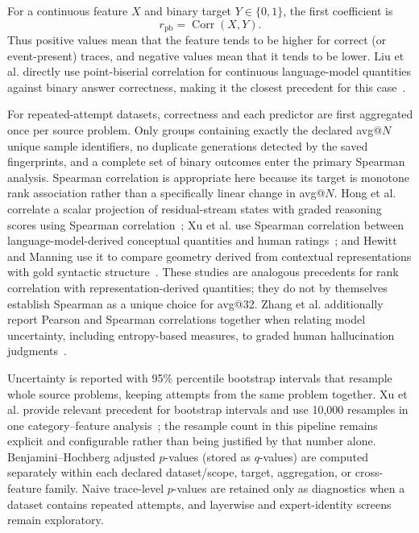 For a continuous feature $X$ and binary target $Y\in\{0,1\}$, the first
coefficient is
\begin{equation}
  r_{\mathrm{pb}} = \operatorname{Corr}(X,Y).
\end{equation}
Thus positive values mean that the feature tends to be higher for correct (or
event-present) traces, and negative values mean that it tends to be lower.
Liu et al. directly use point-biserial correlation for continuous language-model
quantities against binary answer correctness, making it the closest precedent
for this case~\cite{liu-etal-2022-figurative}.

For repeated-attempt datasets, correctness and each predictor are first
aggregated once per source problem.  Only groups containing exactly the
declared avg@$N$ unique sample identifiers, no duplicate generations detected
by the saved fingerprints, and a complete set of binary outcomes enter the
primary Spearman analysis.  Spearman correlation is appropriate here because
its target is monotone rank association rather than a specifically linear
change in avg@$N$.  Hong et al. correlate a
scalar projection of residual-stream states with graded reasoning scores using
Spearman correlation~\cite{hong-etal-2025-interplay}; Xu et al. use Spearman
correlation between language-model-derived conceptual quantities and human
ratings~\cite{xu-etal-2025-conceptual}; and Hewitt and Manning use it to compare
geometry derived from contextual representations with gold syntactic
structure~\cite{hewitt-manning-2019-structural}.  These studies are analogous
precedents for rank correlation with representation-derived quantities; they
do not by themselves establish Spearman as a unique choice for avg@32.
Zhang et al. additionally report Pearson and Spearman correlations together
when relating model uncertainty, including entropy-based measures, to graded
human hallucination judgments~\cite{zhang-etal-2023-uncertainty}.

Uncertainty is reported with 95\% percentile bootstrap intervals that resample
whole source problems, keeping attempts from the same problem together.  Xu et
al. provide relevant precedent for bootstrap intervals and use 10,000
resamples in one category--feature analysis~\cite{xu-etal-2025-conceptual}; the
resample count in this pipeline remains explicit and configurable rather than
being justified by that number alone.  Benjamini--Hochberg adjusted $p$-values (stored as $q$-values)
\cite{benjamini1995fdr} are computed separately within each declared dataset/scope, target, aggregation,
or cross-feature family.  Naive trace-level $p$-values are retained only as
diagnostics when a dataset contains repeated attempts, and layerwise and
expert-identity screens remain exploratory.


